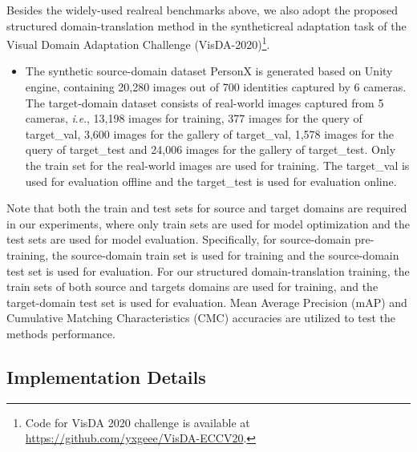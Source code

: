\documentclass[journal]{IEEEtran}
\newcommand{\ie}{\textit{i}.\textit{e}., }
\begin{document}
Besides the widely-used realreal benchmarks above, we also adopt the proposed structured domain-translation method in the syntheticreal adaptation task of the Visual Domain Adaptation Challenge (VisDA-2020)\footnote{Code for VisDA 2020 challenge is available at \url{https://github.com/yxgeee/VisDA-ECCV20}.}.








\begin{itemize}
\item The synthetic source-domain dataset PersonX \cite{sun2019dissecting} is generated based on Unity \cite{riccitiello2015john} engine, containing 20,280 images out of 700 identities captured by 6 cameras. The target-domain dataset consists of real-world images captured from 5 cameras, \ie 13,198 images for training, 377 images for the query of target\_val, 3,600 images for the gallery of target\_val, 1,578 images for the query of target\_test and 24,006 images for the gallery of target\_test.  {Only the train set for the real-world images are used for training. The target\_val is used for evaluation offline and the target\_test is used for evaluation online. }
\end{itemize}

 {Note that both the train and test sets for source and target domains are required in our experiments, where only train sets are used for model optimization and the test sets are used for model evaluation. Specifically, for source-domain pre-training, the source-domain train set is used for training and the source-domain test set is used for evaluation. For our structured domain-translation training, the train sets of both source and targets domains are used for training, and the target-domain test set is used for evaluation.}
Mean Average Precision (mAP) and Cumulative Matching Characteristics (CMC) accuracies are utilized to test the methods performance.

\subsection{Implementation Details}
\label{sec:imp}
\end{document}
